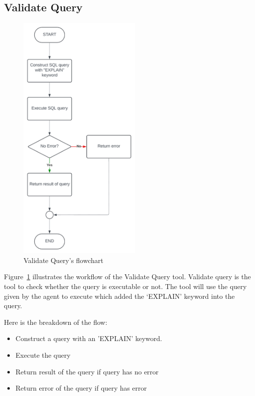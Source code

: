     \subsection{Validate Query}
    \begin{figure}[H]
        \centering
        \includegraphics[width=6cm]{chapters/3/figures/validate.png}
        \caption[Validate Query’s flowchart]{Validate Query’s flowchart}
        \label{fig:validate}
    \end{figure}
    Figure~\ref{fig:validate} illustrates the workflow of the Validate Query tool. Validate query is the tool to check whether the query is executable or not. The tool will use the query given by the agent to execute which added the ‘EXPLAIN’ keyword into the query.

    Here is the breakdown of the flow:
    \begin{itemize}
        \item  Construct a query with an 'EXPLAIN' keyword.
        \item  Execute the query
        \item  Return result of the query if query has no error
        \item  Return error of the query if query has error
    \end{itemize}

